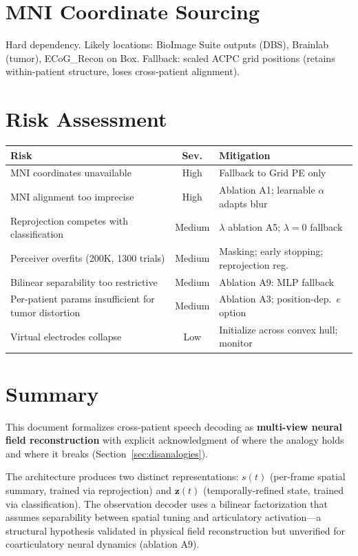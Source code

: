 \documentclass[11pt,letterpaper]{article}
\newcommand{\bfz}{\mathbf{z}}
\begin{document}
\section{MNI Coordinate Sourcing}

Hard dependency. Likely locations: BioImage Suite outputs (DBS), Brainlab (tumor), ECoG\_Recon on Box. Fallback: scaled ACPC grid positions (retains within-patient structure, loses cross-patient alignment).


\section{Risk Assessment}

\begin{table}[h]\centering\small
\begin{tabular}{@{}p{}cp{}@{}}
\toprule
\textbf{Risk} & \textbf{Sev.} & \textbf{Mitigation} \\
\midrule
MNI coordinates unavailable & High & Fallback to Grid PE only \\
MNI alignment too imprecise & High & Ablation A1; learnable $\alpha$ adapts blur \\
Reprojection competes with classification & Medium & $\lambda$ ablation A5; $\lambda{=}0$ fallback \\
Perceiver overfits (200K, 1300 trials) & Medium & Masking; early stopping; reprojection reg. \\
Bilinear separability too restrictive & Medium & Ablation A9: MLP fallback \\
Per-patient params insufficient for tumor distortion & Medium & Ablation A3; position-dep.\ $e$ option \\
Virtual electrodes collapse & Low & Initialize across convex hull; monitor \\
\bottomrule
\end{tabular}
\end{table}


\section{Summary}

This document formalizes cross-patient speech decoding as \textbf{multi-view neural field reconstruction} with explicit acknowledgment of where the analogy holds and where it breaks (Section~\ref{sec:disanalogies}).

The architecture produces two distinct representations: $s(t)$ (per-frame spatial summary, trained via reprojection) and $\bfz(t)$ (temporally-refined state, trained via classification). The observation decoder uses a bilinear factorization that assumes separability between spatial tuning and articulatory activation---a structural hypothesis validated in physical field reconstruction but unverified for coarticulatory neural dynamics (ablation A9).
\end{document}
